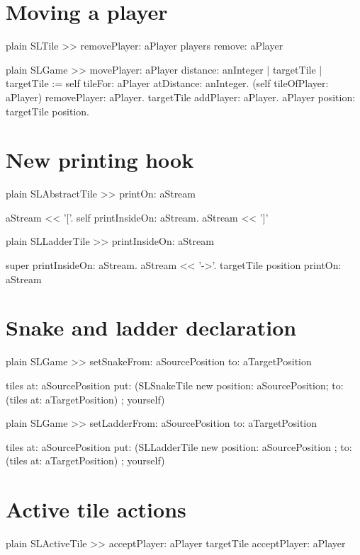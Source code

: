 \documentclass[10pt,twoside,english]{_support/latex/sbabook/sbabook}
\begin{document}
\section{Moving a player}
\begin{displaycode}{plain}
SLTile >> removePlayer: aPlayer
	players remove: aPlayer
\end{displaycode}

\begin{displaycode}{plain}
SLGame >> movePlayer: aPlayer distance: anInteger 
	| targetTile | 
	targetTile := self tileFor: aPlayer atDistance: anInteger.
	(self tileOfPlayer: aPlayer) removePlayer: aPlayer.
	targetTile addPlayer: aPlayer. 
	aPlayer position: targetTile position. 
\end{displaycode}
\section{New printing hook}
\begin{displaycode}{plain}
SLAbstractTile >> printOn: aStream

	aStream << '['.
	self printInsideOn: aStream.
	aStream << ']'	
\end{displaycode}

\begin{displaycode}{plain}
SLLadderTile >> printInsideOn: aStream

	super printInsideOn: aStream.
	aStream << '->'.
	targetTile position printOn: aStream
\end{displaycode}
\section{Snake and ladder declaration}
\begin{displaycode}{plain}
SLGame >> setSnakeFrom: aSourcePosition to: aTargetPosition

	tiles 
		at: aSourcePosition 
		put: (SLSnakeTile new 
				position: aSourcePosition; 
				to: (tiles at: aTargetPosition) ; yourself)
\end{displaycode}

\begin{displaycode}{plain}
SLGame >> setLadderFrom: aSourcePosition to: aTargetPosition

	tiles 
		at: aSourcePosition 
		put: (SLLadderTile new 
				position: aSourcePosition ; 
				to: (tiles at: aTargetPosition) ; yourself)
\end{displaycode}
\section{Active tile actions}
\begin{displaycode}{plain}
SLActiveTile >> acceptPlayer: aPlayer
	targetTile acceptPlayer: aPlayer
\end{displaycode}
\end{document}
